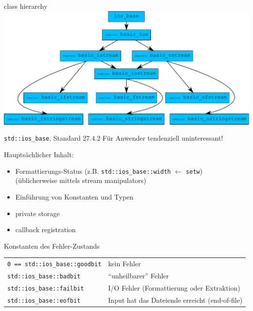\begin{frame}{class hierarchy}
	\includegraphics[width=\textwidth]{images/streams-class-hierarchy}
\end{frame}

\begin{frame}{\texttt{std::ios\_base}, Standard 27.4.2}
	Für Anwender tendenziell uninteressant!
	
	Hauptsächlicher Inhalt:
	\begin{itemize}
		\item Formattierungs-Status (z.B. \texttt{std::ios\_base::width} $\leftarrow$ \texttt{setw})	\\
		(üblicherweise mittels stream manipulators)
		\item Einführung von Konstanten und Typen
		\item private storage
		\item callback registration
	\end{itemize}
	
	\footnotesize
	\begin{block}{Konstanten des Fehler-Zustands}
		\begin{tabular}{ll}
			\texttt{0 == std::ios\_base::goodbit}	&	kein Fehler	\\
			\texttt{std::ios\_base::badbit}			&	\enquote{unheilbarer} Fehler	\\
			\texttt{std::ios\_base::failbit}		&	I/O Fehler (Formattierung oder Extraktion)	\\
			\texttt{std::ios\_base::eofbit}			&	Input hat das Dateiende erreicht (end-of-file)	\\
		\end{tabular}
	\end{block}
\end{frame}

